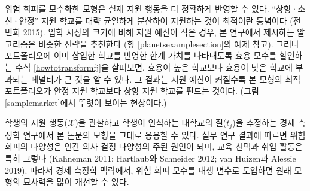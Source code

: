 \documentclass[11pt]{article} %
\newif\ifen
\theoremstyle{definition}
\theoremstyle{definition}
\begin{document}
\ifen
A parametric treatment of risk aversion may align our model more closely to real-world applicant behavior. Conventional wisdom asserts that the best college application strategy combines reach, target, and safety schools in roughly equal proportion (Jeon 2015). When the application budget is small relative to the size of the admissions market, our algorithms recommend a similar approach (see the example of Subsection \ref{planetsexamplesection}). However, inspecting equation \eqref{howtotransformfj}, which discounts school utility parameters to reflect their marginal value relative to the schools already in the portfolio, reveals that low-utility schools are penalized more harshly than high utility schools in the marginal analysis. Consequentially, as the application budget grows, the optimal portfolio in our model tends to favor reach schools over safety schools. (See Figure \ref{samplemarket} for a clear illustration of this phenomenon.) 
 
A potential application of our model is an econometric study that estimates students’ perceptions of college quality ($t_j$) from their observed application behavior ($\mathcal{X}$) under the assumption of utility maximization. Empirical research indicates that heterogeneous risk aversion is a significant source of variation in human decision-making, especially in the domains of educational choice and employment search (Kahneman 2011; Hartlaub and Schneider 2012; van Huizen and Alessie 2019). Therefore, an endogenous risk-aversion parameter would greatly enhance our model’s explanatory power in the econometric setting.
\else
위험 회피를 모수화한 모형은 실제 지원 행동을 더 정확하게 반영할 수 있다. ``상향·소신·안정'' 지원 학교를 대략 균일하게 분산하여 지원하는 것이 최적이란 통념이다 (전민희 2015). 입학 시장의 크기에 비해 지원 예산이 작은 경우, 본 연구에서 제시하는 알고리즘은 비슷한 전략을 추천한다 (항 \ref{planetsexamplesection}의 예제 참고). 그러나 포트폴리오에 이미 삽입한 학교를 반영한 한계 가치를 나타내도록 효용 모수를 할인하는 수식 \eqref{howtotransformfj}을 살펴보면, 효용이 높은 학교보다 효용이 낮은 학교에 부과되는 페널티가 큰 것을 알 수 있다. 그 결과는 지원 예산이 커질수록 본 모형의 최적 포트폴리오가 안정 지원 학교보다 상향 지원 학교를 편드는 것이다. (그림 \ref{samplemarket}에서 뚜렷이 보이는 현상이다.)

학생의 지원 행동($\mathcal{X}$)을 관찰하고 학생이 인식하는 대학교의 질($t_j$)을 추정하는 경제 측정학 연구에서 본 논문의 모형을 그대로 응용할 수 있다. 실무 연구 결과에 따르면 위험 회피의 다양성은 인간 의사 결정 다양성의 주된 원인이 되며, 교육 선택과 취업 활동은 특히 그렇다 (Kahneman 2011; Hartlaub와 Schneider 2012; van Huizen과 Alessie 2019). 따라서 경제 측정학 맥락에서, 위험 회피 모수를 내생 변수로 도입하면 원래 모형의 묘사력을 많이 개선할 수 있다.
\fi
\end{document}
